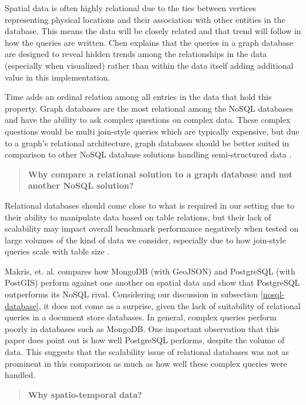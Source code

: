 Spatial data is often highly relational due to the ties between vertices representing physical locations and their association with other entities in the database. This means the data will be closely related and that trend will follow in how the queries are written. Chen \cite{socialdata} explains that the queries in a graph database are designed to reveal hidden trends among the relationships in the data (especially when visualized) rather than within the data itself adding additional value in this implementation.

Time adds an ordinal relation among all entries in the data that hold this property. Graph databases are the most relational among the NoSQL databases and have the ability to ask complex questions on complex data. These complex questions would be multi join-style queries which are typically expensive, but due to a graph's relational architecture, graph databases should be better suited in comparison to other NoSQL database solutions handling semi-structured data \cite{data-in-nosql}.

\begin{quote}
    \textbf{Why compare a relational solution to a graph database and not another NoSQL solution?}
\end{quote}

Relational databases should come close to what is required in our setting due to their ability to manipulate data based on table relations, but their lack of scalability may impact overall benchmark performance negatively when tested on large volumes of the kind of data we consider, especially due to how join-style queries scale with table size \cite{data-in-nosql}.

Makris, et. al. \cite{mongovspostgres} compares how MongoDB (with GeoJSON) and PostgreSQL (with PostGIS) perform against one another on spatial data and show that PostgreSQL outperforms its NoSQL rival. Considering our discussion in subsection \ref{nosql-database}, it does not come as a surprise, given the lack of suitability of relational queries in a document store databases. In general, complex queries perform poorly in databases such as MongoDB. One important observation that this paper does point out is how well PostgreSQL performs, despite the volume of data. This suggests that the scalability issue of relational databases was not as prominent in this comparison as much as how well these complex queries were handled.

\begin{quote}
    \textbf{Why spatio-temporal data?}
\end{quote}


